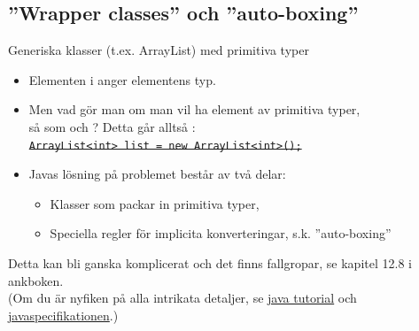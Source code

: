 \subsection{''Wrapper classes'' och ''auto-boxing''}
\begin{Slide}{Generiska klasser (t.ex. ArrayList) med primitiva typer}
\begin{itemize}\footnotesize
\item Elementen i  anger elementens typ.
\item Men vad gör man om man vil ha element av primitiva typer, \\ så som  och ? 
Detta går alltså : \\
\sout{\texttt{ArrayList<int> list = new ArrayList<int>();}}

\vspace{2em}
\item Javas lösning på problemet består av två delar:
\begin{itemize}\footnotesize
\item Klasser som packar in primitiva typer, 
\item Speciella regler för implicita konverteringar, s.k. ''auto-boxing'' 
\end{itemize}
\end{itemize}
\scriptsize\vspace{1em}
Detta kan bli ganska komplicerat och det finns fallgropar, se kapitel 12.8 i ankboken.\\
(Om du är nyfiken på alla intrikata detaljer, se
\href{https://docs.oracle.com/javase/tutorial/java/data/autoboxing.html}{java tutorial} och   \href{https://docs.oracle.com/javase/specs/jls/se8/html/jls-5.html#jls-5.1.7}{javaspecifikationen}.)
\end{Slide}


